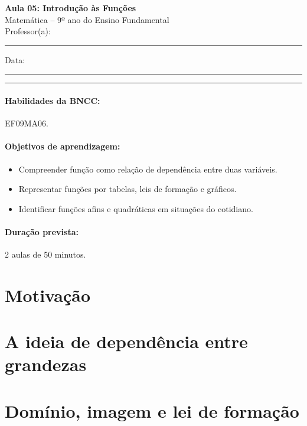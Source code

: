 \documentclass[11pt,a4paper]{article}
\newcommand{\numaula}{05}
\newcommand{\tituloaula}{Introdução às Funções}
\begin{document}
\begin{center}
  {\Large\bfseries Aula \numaula: \tituloaula}\\[4pt]
  {\large Matemática -- 9º ano do Ensino Fundamental}\\[2pt]
  Professor(a): \rule{6cm}{0.4pt} \qquad Data: \rule{3cm}{0.4pt}
\end{center}
\noindent\rule{\linewidth}{0.8pt}

\paragraph{Habilidades da BNCC:} EF09MA06.

\paragraph{Objetivos de aprendizagem:}
\begin{itemize}[nosep]
  \item Compreender função como relação de dependência entre duas variáveis.
  \item Representar funções por tabelas, leis de formação e gráficos.
  \item Identificar funções afins e quadráticas em situações do cotidiano.
\end{itemize}

\paragraph{Duração prevista:} 2 aulas de 50 minutos. %

\section{Motivação}

\section{A ideia de dependência entre grandezas}

\section{Domínio, imagem e lei de formação}
\end{document}

